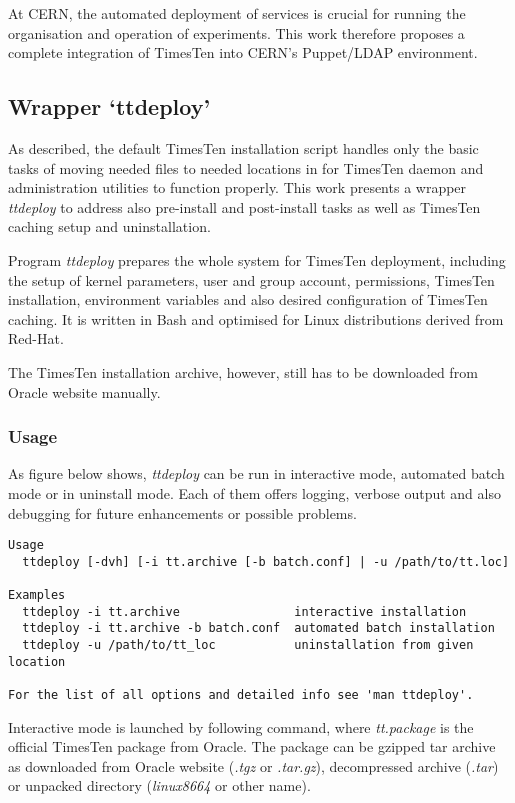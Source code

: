 \documentclass[11pt, letterpaper]{article}
\begin{document}
At CERN, the automated deployment of services is crucial for running the organisation and operation of experiments.  This work therefore proposes a complete integration of TimesTen into CERN’s Puppet/LDAP environment.

\subsection{Wrapper ‘ttdeploy’}

As described, the default TimesTen installation script handles only the basic tasks of moving needed files to needed locations in for TimesTen daemon and administration utilities to function properly. This work presents a wrapper \emph{ttdeploy} to address also pre-install and post-install tasks as well as TimesTen caching setup and uninstallation.

Program \emph{ttdeploy} prepares the whole system for TimesTen deployment, including the setup of kernel parameters, user and group account, permissions, TimesTen installation, environment variables and also desired configuration of TimesTen caching. It is written in Bash and optimised for Linux distributions derived from Red-Hat.

The TimesTen installation archive, however, still has to be downloaded from Oracle website manually.

\subsubsection{Usage}

As figure below shows, \emph{ttdeploy} can be run in interactive mode, automated batch mode or in uninstall mode. Each of them offers logging, verbose output and also debugging for future enhancements or possible problems.

\begin{lstlisting}
Usage
  ttdeploy [-dvh] [-i tt.archive [-b batch.conf] | -u /path/to/tt.loc]

Examples
  ttdeploy -i tt.archive                interactive installation
  ttdeploy -i tt.archive -b batch.conf  automated batch installation
  ttdeploy -u /path/to/tt_loc           uninstallation from given location

For the list of all options and detailed info see 'man ttdeploy'.
\end{lstlisting}

Interactive mode is launched by following command, where \emph{tt.package} is the official TimesTen package from Oracle. The package can be gzipped tar archive as downloaded from Oracle website (\emph{.tgz} or \emph{.tar.gz}), decompressed archive (\emph{.tar}) or unpacked directory (\emph{linux8664} or other name).
\end{document}

